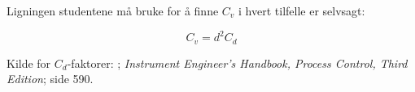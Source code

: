 





Ligningen studentene må bruke for å finne $C_v$ i hvert tilfelle er selvsagt:

$$C_v = d^2 C_d$$

\vskip 10pt

Kilde for $C_d$-faktorer: ; {\it Instrument Engineer's Handbook, Process Control, Third Edition}; side 590.




